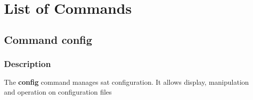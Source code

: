 \documentclass[a4paper,10pt,english]{sphinxmanual}
\begin{document}
\chapter{List of Commands}
\label{index:list-of-commands}\clearpage

\section{Command config}
\label{commands/config:svn}\label{commands/config:command-config}\label{commands/config::doc}

\subsection{Description}
\label{commands/config:description}
The \textbf{config} command manages sat configuration.
It allows display, manipulation and operation on configuration files
\end{document}

